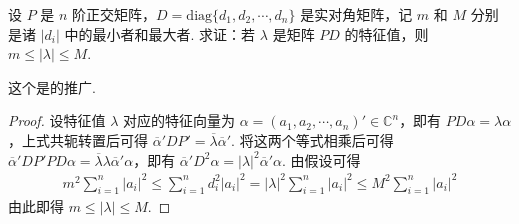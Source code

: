 \documentclass[../../main.tex]{subfiles}%
\begin{document}
\begin{proposition}\label{proposition:例9.47}
设 \(P\) 是 \(n\) 阶正交矩阵，\(D = \mathrm{diag}\{d_1,d_2,\cdots,d_n\}\) 是实对角矩阵，记 \(m\) 和 \(M\) 分别是诸 \(|d_i|\) 中的最小者和最大者. 求证：若 \(\lambda\) 是矩阵 \(PD\) 的特征值，则 \(m \leqslant  |\lambda| \leqslant  M\).
\end{proposition}
\begin{remark}
这个是的推广.
\end{remark}
\begin{proof}
设特征值 \(\lambda\) 对应的特征向量为 \(\alpha = (a_1,a_2,\cdots,a_n)' \in \mathbb{C}^n\)，即有 \(PD\alpha = \lambda\alpha\)，上式共轭转置后可得 \(\overline{\alpha}'D P' = \overline{\lambda}\overline{\alpha}'\). 将这两个等式相乘后可得 \(\overline{\alpha}'DP'PD\alpha = \overline{\lambda}\lambda\overline{\alpha}'\alpha\)，即有 \(\overline{\alpha}'D^2\alpha = |\lambda|^2\overline{\alpha}'\alpha\). 由假设可得
\begin{align*}
m^2\sum_{i = 1}^{n}|a_i|^2 \leqslant  \sum_{i = 1}^{n}d_i^2|a_i|^2 = |\lambda|^2\sum_{i = 1}^{n}|a_i|^2 \leqslant  M^2\sum_{i = 1}^{n}|a_i|^2
\end{align*}
由此即得 \(m \leqslant  |\lambda| \leqslant  M\). 
\end{proof}
\end{document}
